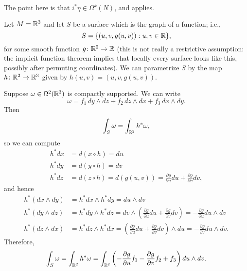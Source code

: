 The point here is that $i^\ast \eta \in \Omega^k(N)$, and  applies.

\begin{example}\label{ex:surface integral}
	Let $M = \mathbb{R}^3$ and let $S$ be a surface which is the graph of a function; i.e.,
	\[
		S = \{(u,v,g(u,v)) : u,v \in \mathbb{R}\},
	\]
	for some smooth function $g \colon\thinspace\! \mathbb{R}^2 \to \mathbb{R}$ (this is not really a restrictive assumption: the implicit function theorem implies that locally every surface looks like this, possibly after permuting coordinates). We can parametrize $S$ by the map $h \colon\thinspace\! \mathbb{R}^2 \to \mathbb{R}^3$ given by $h(u,v) = (u,v,g(u,v))$.
	
	Suppose $\omega \in \Omega^2(\mathbb{R}^3)$ is compactly supported. We can write
	\[
		\omega = f_1 \, dy\wedge dz + f_2 \, dz \wedge dx + f_3 \, dx \wedge dy.
	\]
	Then
	\[
		\int_S \omega = \int_{\mathbb{R}^2} h^\ast \omega,
	\]
	so we can compute
	\begin{align*}
		h^\ast dx & = d(x \circ h) = du \\
		h^\ast dy & = d(y \circ h) = dv \\
		h^\ast dz & = d(z \circ h) = d(g(u,v)) = \frac{\partial g}{\partial u} du + \frac{\partial g}{\partial v} dv,
	\end{align*}
	and hence
	\begin{align*}
		h^\ast (dx \wedge dy) & = h^\ast dx \wedge h^\ast dy = du \wedge dv \\
		h^\ast (dy \wedge dz) & = h^\ast dy \wedge h^\ast dz = dv \wedge \left(\frac{\partial g}{\partial u} du + \frac{\partial g}{\partial v} dv \right) = -\frac{\partial g}{\partial u} du  \wedge dv \\
		h^\ast (dz \wedge dx) & = h^\ast dz \wedge h^\ast dx = \left( \frac{\partial g}{\partial u} du + \frac{\partial g}{\partial v} dv\right) \wedge du = -\frac{\partial g}{\partial v} du \wedge dv.
	\end{align*}
	Therefore,
	\begin{equation}\label{eq:surface integral formula} 
		\int_S \omega = \int_{\mathbb{R}^2} h^\ast \omega = \int_{\mathbb{R}^2} \left( -\frac{\partial g}{\partial u}f_1 -\frac{\partial g}{\partial v}f_2 + f_3\right) du \wedge dv.
	\end{equation}
	

\end{example}
